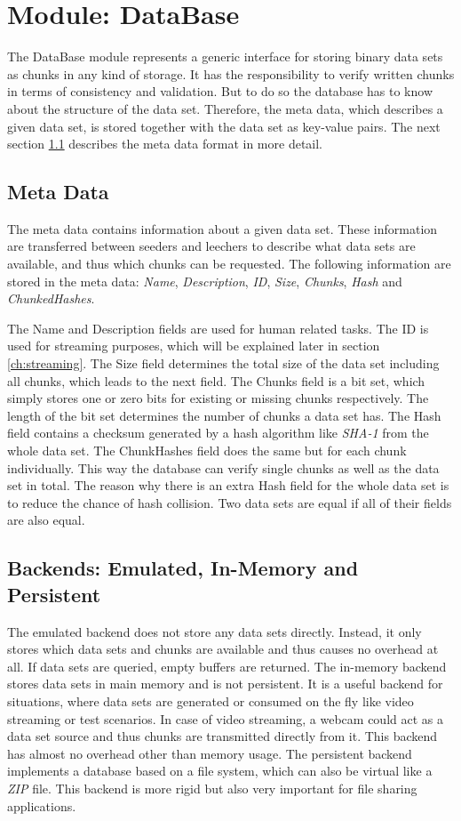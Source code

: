 \cleardoublepage
\chapter{Module: DataBase}
\label{ch:database}
The DataBase module represents a generic interface for storing binary data sets as chunks in any kind of storage. It has the responsibility to verify written chunks in terms of consistency and validation. But to do so the database has to know about the structure of the data set. Therefore, the meta data, which describes a given data set, is stored together with the data set as key-value pairs. The next section \ref{sec:metadata} describes the meta data format in more detail.


\section{Meta Data}
\label{sec:metadata}
The meta data contains information about a given data set. These information are transferred between seeders and leechers to describe what data sets are available, and thus which chunks can be requested. The following information are stored in the meta data: \emph{Name}, \emph{Description}, \emph{ID}, \emph{Size}, \emph{Chunks}, \emph{Hash} and \emph{ChunkedHashes}.

The Name and Description fields are used for human related tasks. The ID is used for streaming purposes, which will be explained later in section \ref{ch:streaming}. The Size field determines the total size of the data set including all chunks, which leads to the next field. The Chunks field is a bit set, which simply stores one or zero bits for existing or missing chunks respectively. The length of the bit set determines the number of chunks a data set has. The Hash field contains a checksum generated by a hash algorithm like \emph{SHA-1} from the whole data set. The ChunkHashes field does the same but for each chunk individually. This way the database can verify single chunks as well as the data set in total. The reason why there is an extra Hash field for the whole data set is to reduce the chance of hash collision. Two data sets are equal if all of their fields are also equal.


\section{Backends: Emulated, In-Memory and Persistent}
\label{sec:backend}
The emulated backend does not store any data sets directly. Instead, it only stores which data sets and chunks are available and thus causes no overhead at all. If data sets are queried, empty buffers are returned. The in-memory backend stores data sets in main memory and is not persistent. It is a useful backend for situations, where data sets are generated or consumed on the fly like video streaming or test scenarios. In case of video streaming, a webcam could act as a data set source and thus chunks are transmitted directly from it. This backend has almost no overhead other than memory usage. The persistent backend implements a database based on a file system, which can also be virtual like a \emph{ZIP} file. This backend is more rigid but also very important for file sharing applications.


